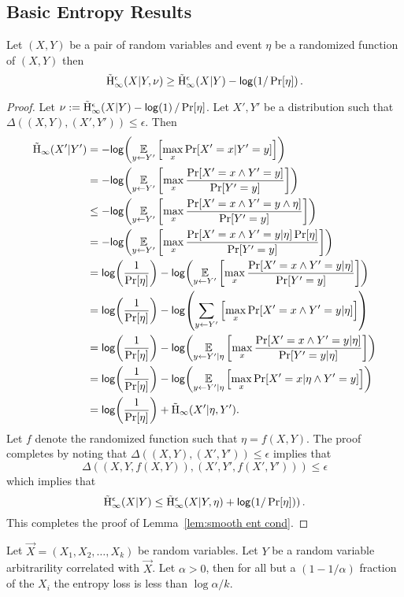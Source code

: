 \subsection{Basic Entropy Results}
\begin{lemma}
Let $(X, Y)$ be a pair of random variables and event $\eta$ be a randomized function of $(X, Y)$ then 
\[
\tilde{\mathrm{H}}_\infty^\epsilon(X|Y, \nu)\ge \tilde{\mathrm{H}}_\infty^\epsilon(X|Y) - \mathsf{log}\!\left( 1/\Pr[\eta]\right).
\]
\label{lem:smooth ent cond}
\end{lemma}
\begin{proof}
Let $\nu := \tilde{\mathrm{H}}_\infty^\epsilon(X|Y) - \mathsf{log}\!\left(1\right)/\Pr[\eta]$.
Let $X', Y'$ be a distribution such that $\Delta((X, Y), (X', Y')) \le \epsilon$.  Then 
\begin{align*}
\Hav(X' | Y') &= -\log{\expe_{y\leftarrow Y'}\left[\max_{x} \Pr[X'=x | Y'=y]\right]}\\ 
&=-\log{\expe_{y\leftarrow Y'}\left[\max_{x} \frac{\Pr[X'=x \wedge Y'=y]}{\Pr[Y'=y]}\right]}\\
&\le-\log{\expe_{y\leftarrow Y'}\left[\max_{x} \frac{\Pr[X'=x \wedge Y'=y \wedge \eta]}{\Pr[Y'=y]}\right]}\\
&=-\log{\expe_{y\leftarrow Y'}\left[\max_{x} \frac{\Pr[X'=x \wedge Y'=y |\eta]\Pr[\eta]}{\Pr[Y'=y]}\right]}\\
&=\log{\frac{1}{\Pr[\eta]}}-\log{\expe_{y\leftarrow Y'}\left[\max_{x} \frac{\Pr[X'=x \wedge Y'=y |\eta]}{\Pr[Y'=y]}\right]}\\
&=\log{\frac{1}{\Pr[\eta]}}-\log{\sum_{y\leftarrow Y'}\left[\max_{x} \Pr[X'=x \wedge Y'=y |\eta]\right]}\\
&=\log{\frac{1}{\Pr[\eta]}}-\log{\expe_{y\leftarrow Y' | \eta}\left[\max_{x} \frac{\Pr[X'=x \wedge Y'=y |\eta]}{\Pr[Y'=y |\eta]}\right]}\\
&=\log{\frac{1}{\Pr[\eta]}}-\log{\expe_{y\leftarrow Y' | \eta}\left[\max_{x} \Pr[X'=x | \eta \wedge Y'=y ]\right]}\\
&=\log{\frac{1}{\Pr[\eta]}}+\Hav(X'| \eta, Y').
\end{align*}
Let $f$ denote the randomized function such that $\eta = f(X, Y)$.  
The proof completes by noting that $\Delta((X, Y), (X', Y'))\le \epsilon$ implies that \[\Delta((X, Y, f(X, Y)), (X', Y', f(X', Y')))\le \epsilon\]  which implies that 
\[
\tilde{\mathrm{H}}_\infty^\epsilon(X| Y) \le \tilde{\mathrm{H}}_\infty^\epsilon(X|Y, \eta) +\mathsf{log}\!\left(1/\Pr[\eta])\right).
\]
This completes the proof of Lemma~\ref{lem:smooth ent cond}.
\end{proof}


\begin{lemma}{\cite[Lemma 2.2a]{dodis2008fuzzy}}
    \label{lem:markovpred}
    Let $\vec{X} = (X_1, X_2, \ldots, X_k)$ be random variables. Let $Y$ be a random variable arbitrarility correlated with $\vec{X}$. 
    Let $\alpha > 0$, then for all but a $(1-1/\alpha)$ fraction of the $X_i$ the entropy loss is less than $\log{\alpha}/k$. 
\end{lemma}

